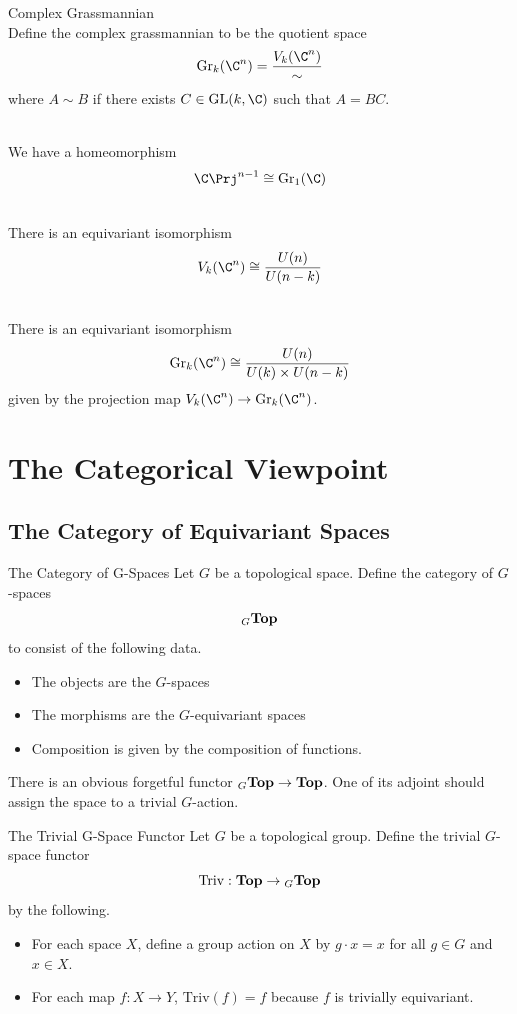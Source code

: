 \documentclass[a4paper]{article}
\begin{document}
\begin{defn}{Complex Grassmannian}{}\\
Define the complex grassmannian to be the quotient space $$\text{Gr}_k(\C^n)=\frac{V_k(\C^n)}{\sim}$$ where $A\sim B$ if there exists $C\in\text{GL}(k,\C)$ such that $A=BC$. 
\end{defn}

\begin{eg}{}{}\\
We have a homeomorphism $$\C\Prj^{n-1}\cong\text{Gr}_1(\C)$$
\end{eg}

\begin{prp}{}{}\\
There is an equivariant isomorphism $$V_k(\C^n)\cong\frac{U(n)}{U(n-k)}$$
\end{prp}

\begin{prp}{}{}\\
There is an equivariant isomorphism $$\text{Gr}_k(\C^n)\cong\frac{U(n)}{U(k)\times U(n-k)}$$ given by the projection map $V_k(\C^n)\to\text{Gr}_k(\C^n)$. 
\end{prp}


\pagebreak
\section{The Categorical Viewpoint}
\subsection{The Category of Equivariant Spaces}
\begin{defn}{The Category of G-Spaces}{} Let $G$ be a topological space. Define the category of $G$-spaces $${_G}\bold{Top}$$ to consist of the following data. 
\begin{itemize}
\item The objects are the $G$-spaces
\item The morphisms are the $G$-equivariant spaces
\item Composition is given by the composition of functions. 
\end{itemize}
\end{defn}

There is an obvious forgetful functor ${_G}\bold{Top}\to\bold{Top}$. One of its adjoint should assign the space to a trivial $G$-action. 

\begin{defn}{The Trivial G-Space Functor}{} Let $G$ be a topological group. Define the trivial $G$-space functor $$\text{Triv}:\bold{Top}\to{_G\bold{Top}}$$ by the following. 
\begin{itemize}
\item For each space $X$, define a group action on $X$ by $g\cdot x=x$ for all $g\in G$ and $x\in X$. 
\item For each map $f:X\to Y$, $\text{Triv}(f)=f$ because $f$ is trivially equivariant. 
\end{itemize}
\end{defn}
\end{document}
